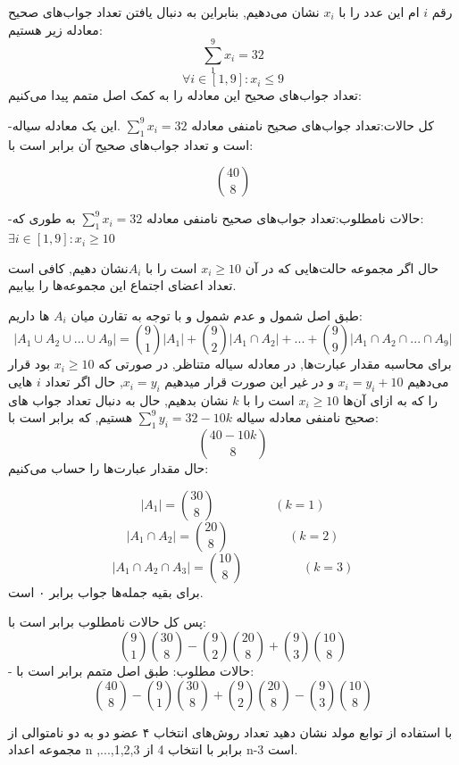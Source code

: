 \documentclass[11pt,largemargins]{h2wp}
\begin{document}
رقم $i$ ام این عدد را با $x_i$ نشان می‌دهیم, بنابراین به دنبال یافتن تعداد جواب‌های صحیح معادله زیر هستیم:
    \[\sum\limits_1^9 x_i=32\]
    \[\forall i \in [1,9] : x_i\leq 9\]
  تعداد جواب‌های صحیح این معادله را به کمک اصل متمم پیدا می‌کنیم:
  
     -کل حالات:تعداد جواب‌های صحیح نامنفی معادله  $\sum\limits_1^9 x_i=32 $ .این یک معادله سیاله است و تعداد جواب‌های صحیح آن برابر است با:
     
     \[\binom{40}{8}\]
     
    -حالات نامطلوب:تعداد جواب‌های صحیح نامنفی معادله $\sum\limits_1^9 x_i=32$  
     به طوری که:
     $\exists i \in [1,9] : x_i\geq 10$
     
     حال اگر مجموعه حالت‌هایی که در آن $x_i\geq 10 $ است را با $A_i$نشان دهیم, کافی است تعداد اعضای اجتماع این مجموعه‌ها را بیابیم.
      
     طبق اصل شمول و عدم شمول و با توجه به تقارن میان $A_i$ ها داریم: 
     \[|A_1\cup A_2\cup... \cup A_9|=\binom{9}{1}|A_1|+\binom{9}{2}|A_1\cap A_2|+...+\binom{9}{9}|A_1\cap A_2\cap...\cap A_9|\]
   برای محاسبه مقدار عبارت‌ها, در معادله سیاله متناظر, در صورتی که $x_i\geq 10$ بود قرار می‌دهیم $x_i=y_i+10 $ و در غیر این صورت قرار میدهیم $x_i=y_i$, حال اگر تعداد $i$ هایی را که به ازای آن‌ها $x_i\geq 10 $ است را با $k$ نشان بدهیم, حال به دنبال تعداد جواب های صحیح نامنفی معادله سیاله $\sum\limits_1^9 y_i=32-10k $ هستیم, که برابر است با: 
   \[\binom{40-10k}{8}\] 
    حال مقدار عبارت‌ها را حساب می‌کنیم:
    
    \[|A_1|=\binom{30}{8}\hspace{2cm} (k=1)\]
    \[|A_1\cap A_2|=\binom{20}{8}\hspace{2cm} (k=2)\]
    \[|A_1\cap A_2\cap A_3|=\binom{10}{8}\hspace{2cm} (k=3)\]
    برای بقیه جمله‌ها جواب برابر ۰ است.
    
    پس کل حالات نامطلوب برابر است با:
    \[\binom{9}{1}\binom{30}{8}-\binom{9}{2}\binom{20}{8}+\binom{9}{3}\binom{10}{8}\]
     - حالات مطلوب: طبق اصل متمم برابر است با:
     \[\binom{40}{8}- \binom{9}{1}\binom{30}{8}+\binom{9}{2}\binom{20}{8}-\binom{9}{3}\binom{10}{8}\]
    
    

\question 


   با استفاده از توابع مولد نشان دهید تعداد روش‌های انتخاب ۴ عضو دو به دو  نامتوالی از مجموعه اعداد n
			 ,...,1,2,3
			 برابر با 
			 انتخاب 4 از n-3 است.
			 
\end{document}
